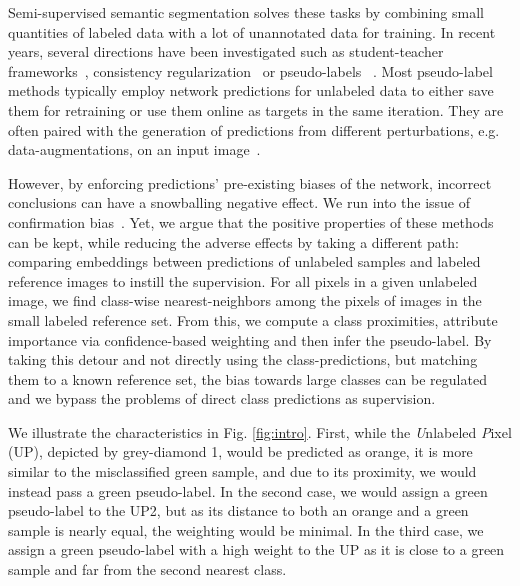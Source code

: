 \documentclass[letterpaper]{article} %
\begin{document}
Semi-supervised semantic segmentation solves these tasks by combining small quantities of labeled data with a lot of unannotated data for training.
In recent years, several directions have been investigated such as student-teacher frameworks~\cite{gou2021knowledge,chen2020big,Xie_2020_CVPR,pham2021meta}, consistency regularization~\cite{ouali2020semi,sohn2020fixmatch,rebuffi2020semi} or pseudo-labels ~\cite{lee2013pseudo,iscen2019label,rizve2021defense}.
Most pseudo-label methods typically employ network predictions for unlabeled data to either save them for retraining or use them online as targets in the same iteration. They are often paired with the generation of predictions from different perturbations, e.g. data-augmentations, on an input image~\cite{berthelot2019mixmatch,berthelot2019remixmatch,sohn2020fixmatch}.

However, by enforcing predictions' pre-existing biases of the network, incorrect conclusions can have a snowballing negative effect. We run into the issue of confirmation bias~\cite{rizve2021defense}.
Yet, we argue that the positive properties of these methods can be kept, while reducing the adverse effects by taking a different path: comparing embeddings between predictions of unlabeled samples and labeled reference images to instill the supervision.
For all pixels in a given unlabeled image, we find class-wise nearest-neighbors among the pixels of images in the small labeled reference set.
From this, we compute a class proximities, attribute importance via confidence-based weighting and then infer the pseudo-label.
By taking this detour and not directly using the class-predictions, but matching them to a known reference set, the bias towards large classes can be regulated and  we bypass the problems of direct class predictions as supervision.

We illustrate the characteristics in Fig. \ref{fig:intro}.
First, while the \textit{U}nlabeled \textit{P}ixel (UP), depicted by grey-diamond 1, would be predicted as orange, it is more similar to the misclassified green sample, and due to its proximity, we would instead pass a green pseudo-label.
In the second case, we would assign a green pseudo-label to the UP2, but as its distance to both an orange and a green sample is nearly equal, the weighting would be minimal.
In the third case, we assign a green pseudo-label with a high weight to the UP as it is close to a green sample and far from the second nearest class.
\end{document}
